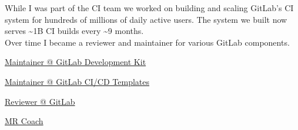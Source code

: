 \documentclass[]{matija-resume}
\begin{document}
\begin{minipage}[t]{1.0\textwidth}

\vspace{\topsep}
While I was part of the CI team we worked on building and scaling GitLab's CI system for hundreds of millions of daily active users. The system we built now serves \textasciitilde 1B CI builds every \textasciitilde 9 months.\\
\vspace{\topsep}
Over time I became a reviewer and maintainer for various GitLab components.
\vspace{\topsep}
\begin{tightemize}
\item \href{https://gitlab.com/gitlab-org/gitlab-development-kit/}{Maintainer @ GitLab Development Kit }
\item \href{https://gitlab.com/gitlab-org/gitlab/-/tree/master/lib/gitlab/ci/templates}{Maintainer @ GitLab CI/CD Templates }
\item \href{https://gitlab.com/gitlab-org/gitlab/}{Reviewer @ GitLab }
\item \href{https://about.gitlab.com/job-families/expert/merge-request-coach/}{MR Coach }
\end{tightemize}


\end{minipage}
\end{document}

